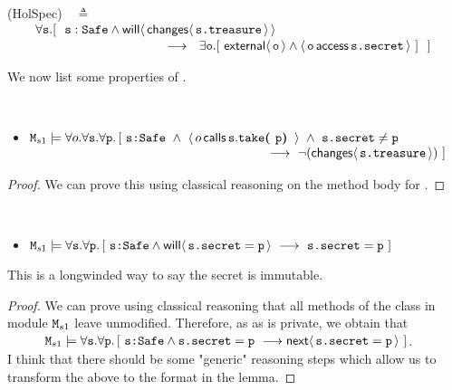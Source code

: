 \documentclass[acmsmall,screen,anonymous,review]{acmart}
\begin{document}
\vspace{.1in}
(HolSpec)\ \  $\triangleq$\\ 
$\strut \hspace{.3in}   \forall \prg{s}. %
[\ \ \prg{s}:\prg{Safe} \wedge \Future{ \Changes{\prg{s.treasure}}}  $ \\ 
 $ \strut \hspace{4.3cm}     \longrightarrow \ \  \exists \prg{o}. [\  \External{\prg{o}} \wedge  \CanAccess{\prg{o}}{\prg{s.secret}}\ ]  \  \ ]  $
\vspace{.1in}


\vspace{.2in}

We now list some properties of .

\begin{lemma}
\label{lemma:noeffect}
~ ~ ~

\begin{itemize}
\item $\M_{s1} \models \forall o. \forall \prg{s}.\forall \prg{p}.\, [ \ \prg{s:Safe}\ \wedge\ {\Calls {o} {\prg{take}} {\prg{s}} {\prg{p}} }\ \wedge\
 \prg{s.secret}\neq\prg{p}$\\
 $\strut ~\hspace{2.5in}
\ \longrightarrow \ \neg (\Changes {\prg{s.treasure}} )\ ]$
\end{itemize}

\end{lemma}
\begin{proof} We can prove this using classical reasoning on the method body for .
\end{proof}

\begin{lemma}
~ ~

\label{lemma:secret}
\begin{itemize}
\item $\M_{s1} \models \forall \prg{s}. \forall \prg{p}.\, [ \ \prg{s:Safe} \wedge \Future{\prg{s.secret}=\prg{p} }\ \longrightarrow \ \prg{s.secret}=\prg{p}\ ]$
\end{itemize}

\end{lemma}
This is a longwinded way to say the secret is immutable.

\begin{proof} We can prove using classical reasoning that all methods of the class  in module  $\M_{s1}$ leave  unmodified. Therefore,
as as \prg{secret} is private, we obtain that \\
$\strut \hspace{.4in} \M_{s1} \models \forall \prg{s}. \forall \prg{p}.\, [ \ \prg{s:Safe} \wedge \prg{s.secret}=\prg{p} \ \longrightarrow \Next{\prg{s.secret}=\prg{p} } \ ] $.\\
I think that there should be some "generic" reasoning steps which allow us to transform the above to the format in the lemma.
\end{proof}
\end{document}

